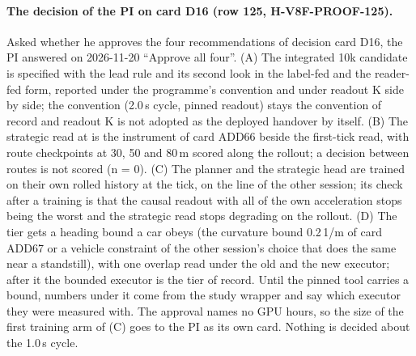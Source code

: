 \paragraph{The decision of the PI on card D16 (row 125, H-V8F-PROOF-125).} Asked whether he approves the four recommendations of decision card D16, the PI answered on 2026-11-20 ``Approve all four''. (A) The integrated 10k candidate is specified with the lead rule and its second look in the label-fed and the reader-fed form, reported under the programme's convention and under readout K side by side; the convention (2.0\,s cycle, pinned readout) stays the convention of record and readout K is not adopted as the deployed handover by itself. (B) The strategic read at  is the instrument of card ADD66 beside the first-tick read, with route checkpoints at 30, 50 and 80\,m scored along the rollout; a decision between routes is not scored (n = 0). (C) The planner and the strategic head are trained on their own rolled history at the tick, on the line of the other session; its check after a training is that the causal readout with all of the own acceleration stops being the worst and the strategic read stops degrading on the rollout. (D) The  tier gets a heading bound a car obeys (the curvature bound 0.2\,1/m of card ADD67 or a vehicle constraint of the other session's choice that does the same near a standstill), with one overlap read under the old and the new executor; after it the bounded executor is the tier of record. Until the pinned tool carries a bound, numbers under it come from the study wrapper and say which executor they were measured with. The approval names no GPU hours, so the size of the first training arm of (C) goes to the PI as its own card. Nothing is decided about the 1.0\,s cycle.



